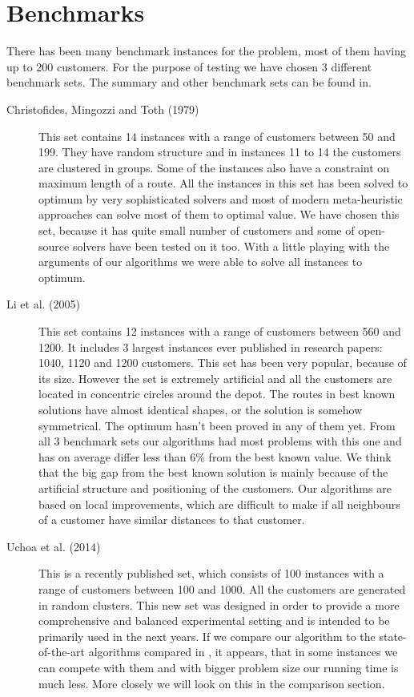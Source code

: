 \documentclass[thesis=B,english]{FITthesis}[2012/10/20]
\begin{document}
    \section{Benchmarks}
    There has been many benchmark instances for the problem, most of them having up to 200 customers.
    For the purpose of testing we have chosen 3 different benchmark sets.
    The summary and other benchmark sets can be found in\cite{3}.
    \begin{description}
      \item[Christofides, Mingozzi and Toth (1979)\cite{4}] \hfill \break
      This set contains 14 instances with a range of customers between 50 and 199. They have random structure and in instances 11 to 14 the customers are clustered in groups. Some of the instances also have a constraint on maximum length of a route. All the instances in this set has been solved to optimum by very sophisticated solvers and most of modern meta-heuristic approaches can solve most of them to optimal value. We have chosen this set, because it has quite small number of customers and some of open-source solvers have been tested on it too. With a little playing with the arguments of our algorithms we were able to solve all instances to optimum.
      \item[Li et al. (2005)\cite{6}] \hfill \break
      This set contains 12 instances with a range of customers between 560 and 1200. It includes 3 largest instances ever published in research papers: 1040, 1120 and 1200 customers. This set has been very popular, because of its size. However the set is extremely artificial and all the customers are located in concentric circles around the depot. The routes in best known solutions have almost identical shapes, or the solution is somehow symmetrical. The optimum hasn't been proved in any of them yet. From all 3 benchmark sets our algorithms had most problems with this one and has on average differ less than 6\% from the best known value. We think that the big gap from the best known solution is mainly because of the artificial structure and positioning of the customers. Our algorithms are based on local improvements, which are difficult to make if all neighbours of a customer have similar distances to that customer.
      \item[Uchoa et al. (2014)\cite{3}] \hfill \break
      This is a recently published set, which consists of 100 instances with a range of customers between 100 and 1000. All the customers are generated in random clusters. This new set was designed in order to provide a more comprehensive and balanced experimental setting and is intended to be primarily used in the next years. If we compare our algorithm to the state-of-the-art algorithms compared in \cite{3}, it appears, that in some instances we can compete with them and with bigger problem size our running time is much less. More closely we will look on this in the comparison section.
    \end{description}
\end{document}
